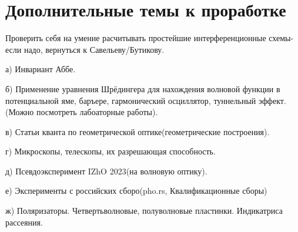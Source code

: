 \documentclass{article}
\begin{document}
\Large\section{Дополнительные темы к проработке}
\large{
Проверить себя на умение расчитывать простейшие интерференционные схемы- если надо, вернуться к Савельеву/Бутикову.

а) Инвариант Аббе.

б) Применение уравнения Шрёдингера для нахождения волновой функции в потенциальной яме, баръере, гармонический осциллятор, туннельный эффект. (Можно посмотреть лабоаторные работы).

в) Статьи кванта по геометрической оптике(геометрические построения).

г) Микроскопы, телескопы, их разрешающая способность.

д) Псевдоэксперимент IZhO 2023(на волновую оптику).

е) Эксперименты с российских сборо(pho.rs, Квалификационные сборы)

ж) Поляризаторы. Четвертьволновые, полуволновые пластинки. Индикатриса рассеяния.
}
\end{document}
